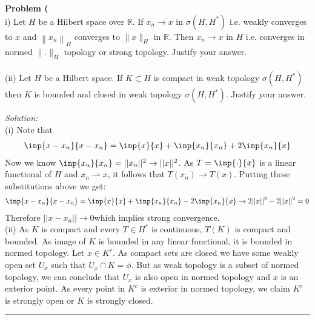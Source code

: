 \documentclass[a4paper, 11pt]{article}
\newenvironment{problem}[2][Problem]
    { \begin{mdframed}[backgroundcolor=gray!20] \textbf{#1 #2} \\}
    {  \end{mdframed}}
\newenvironment{solution}
    {\textit{Solution:}}
    {}
\begin{document}
\begin{problem}{3}
    (i) Let $H$ be a Hilbert space over $\mathbb{R}$. If $x_{n} \rightarrow x$ in $\sigma\left(H, H^{*}\right)$ i.e. weakly converges to $x$ and $\left\|x_{n}\right\|_{H}$ converges to $\|x\|_{H}$ in $\mathbb{R}$. Then $x_{n} \longrightarrow x$ in $H$ i.e. converges in normed $\|.\|_{H}$ topology or strong topology. Justify your answer.\\ \\
    (ii) Let $H$ be a Hilbert space. If $K \subset H$ is compact in weak topology $\sigma\left(H, H^{*}\right)$ then $K$ is bounded and closed in weak topology $\sigma\left(H, H^{*}\right)$. Justify your answer.
\end{problem}
\begin{solution}
    \ \\
    (i) Note that
    \begin{align*}
        \inp{x-x_n}{x-x_n}=\inp{x}{x}+\inp{x_n}{x_n}+2\inp{x_n}{x}
    \end{align*}
    Now we know $\inp{x_n}{x_n}=||x_n||^2\to ||x||^2$. As $T=\inp{\cdot}{x}$ is a linear functional of $H$ and $x_n\rightharpoonup x$, it follows that $T(x_n)\to T(x)$. Putting those substitutions above we get:
    \begin{align*}
        \inp{x-x_n}{x-x_n}=\inp{x}{x}+\inp{x_n}{x_n}-2\inp{x_n}{x}\to 2||x||^2-2||x||^2=0
    \end{align*}
    Therefore $||x-x_n||\to 0$which implies strong convergence.\\
    (ii) As $K$ is compact and every $T\in H^{*}$ is continuous, $T(K)$ is compact and bounded. As image of $K$ is bounded in any linear functional, it is bounded in normed topology. Let $x\in K^c$. As compact sets are closed we have some weakly open set $U_x$ such that $U_x\cap K=\phi$. But as weak topology is a subset of normed topology, we can conclude that $U_x$ is also open in normed topology and $x$ is an exterior point. As every point in $K^c$ is exterior in normed topology, we claim $K^c$ is strongly open or $K$ is strongly closed.
\end{solution}

\noindent\rule{7in}{2.8pt}
\end{document}
